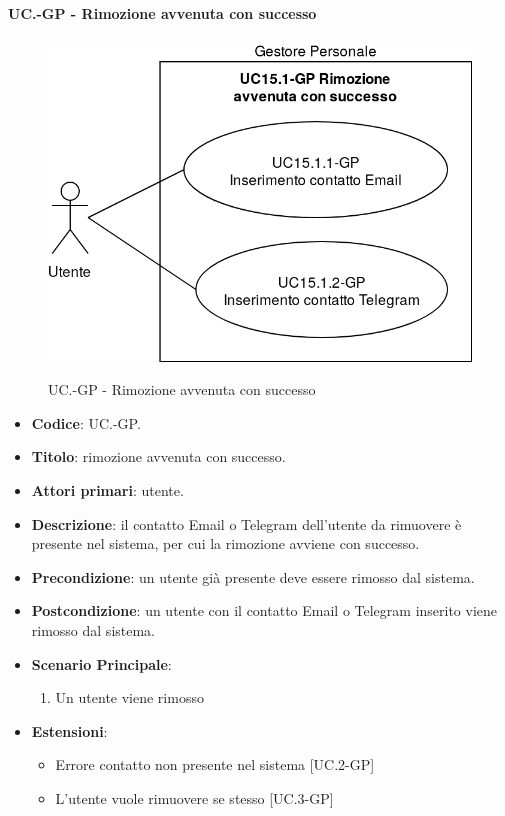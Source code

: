 	\paragraph{UC\theuccount.\thesubuccount-GP - Rimozione avvenuta con successo}
		\begin{figure}[H]
			\centering
			\includegraphics[width=0.6\columnwidth]{img/casi_d'uso/UC15_1.png}\\
			\caption{UC\theuccount.\thesubuccount-GP - Rimozione avvenuta con successo}
		\end{figure}
		\begin{itemize}
			\item \textbf{Codice}: UC\theuccount.\thesubuccount-GP.
			\item \textbf{Titolo}: rimozione avvenuta con successo.
			\item \textbf{Attori primari}: utente.
			\item \textbf{Descrizione}: il contatto Email o Telegram dell'utente da rimuovere è presente nel sistema, per cui la rimozione avviene con successo.
			\item \textbf{Precondizione}: un utente già presente deve essere rimosso dal sistema.
			\item \textbf{Postcondizione}: un utente con il contatto Email o Telegram inserito viene rimosso dal sistema.
			\item \textbf{Scenario Principale}:
			\begin{enumerate}
				\item Un utente viene rimosso
			\end{enumerate}
			\item \textbf{Estensioni}:
			\begin{itemize}
				\item Errore contatto non presente nel sistema [UC\theuccount.2-GP]
				\item L'utente vuole rimuovere se stesso [UC\theuccount.3-GP]
			\end{itemize}
		\end{itemize}
			
